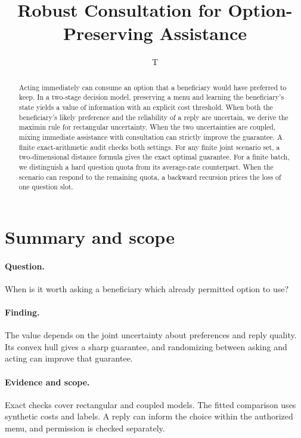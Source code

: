 \documentclass[11pt]{article}
\title{Robust Consultation for Option-Preserving Assistance}
\author{T}
\date{}
\begin{document}
\maketitle

\begin{abstract}
Acting immediately can consume an option that a beneficiary would
have preferred to keep. In a two-stage decision model, preserving
a menu and learning the beneficiary's state yields a value
of information with an explicit cost threshold. When both the
beneficiary's likely preference and the reliability of a reply
are uncertain, we derive the maximin rule for rectangular uncertainty.
When the two uncertainties are coupled, mixing immediate assistance
with consultation can strictly improve the guarantee. A finite
exact-arithmetic audit checks both settings. For any finite
joint scenario set, a two-dimensional distance formula gives
the exact optimal guarantee. For a finite batch, we distinguish a
hard question quota from its average-rate counterpart. When the
scenario can respond to the remaining quota, a backward recursion
prices the loss of one question slot.
\end{abstract}

\section*{Summary and scope}
\paragraph{Question.} When is it worth asking a beneficiary
which already permitted option to use?
\paragraph{Finding.} The value depends on the joint uncertainty
about preferences and reply quality. Its convex hull gives a
sharp guarantee, and randomizing between asking and acting can
improve that guarantee.
\paragraph{Evidence and scope.} Exact checks cover
rectangular and coupled models. The fitted comparison uses
synthetic costs and labels. A reply can inform the choice
within the authorized menu, and permission is checked separately.
\end{document}
